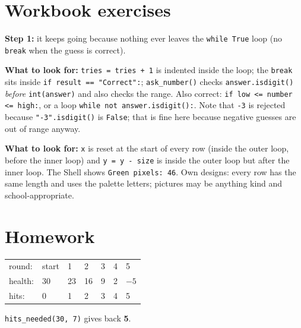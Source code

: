 
\section{Workbook exercises}
\begin{answer}
\textbf{Step 1:} it keeps going because nothing ever leaves the \texttt{while True} loop (no \texttt{break} when the guess is correct).\par
\textbf{What to look for:} \texttt{tries = tries + 1} is indented inside the loop; the \texttt{break} sits inside \texttt{if result == "Correct":};
\texttt{ask\_number()} checks \texttt{answer.isdigit()} \emph{before} \texttt{int(answer)} and also checks the range.
Also correct: \texttt{if low <= number <= high:}, or a loop \texttt{while not answer.isdigit():}. Note that \texttt{-3} is rejected
because \texttt{"-3".isdigit()} is \texttt{False}; that is fine here because negative guesses are out of range anyway.
\end{answer}

\begin{answer}
\textbf{What to look for:} \texttt{x} is reset at the start of every row (inside the outer loop, before the inner loop) and
\texttt{y = y - size} is inside the outer loop but after the inner loop. The Shell shows \texttt{Green pixels: 46}.
Own designs: every row has the same length and uses the palette letters; pictures may be anything kind and school-appropriate.
\end{answer}

\section{Homework}
\begin{answer}
\begin{tabular}{@{}lllllll@{}}
round: & start & 1 & 2 & 3 & 4 & 5 \\
health: & 30 & 23 & 16 & 9 & 2 & $-5$ \\
hits: & 0 & 1 & 2 & 3 & 4 & 5 \\
\end{tabular}\par
\texttt{hits\_needed(30, 7)} gives back \textbf{5}.
\end{answer}

